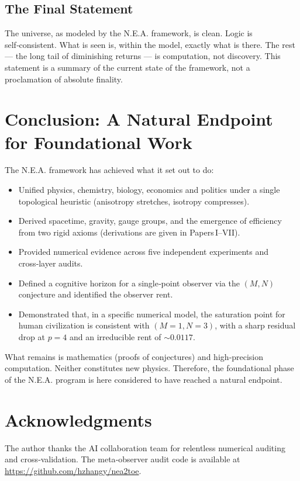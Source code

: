 \documentclass[12pt,a4paper]{article}
\begin{document}
\subsection{The Final Statement}

The universe, as modeled by the N.E.A. framework, is clean. Logic is self‑consistent. What is seen is, within the model, exactly what is there. The rest — the long tail of diminishing returns — is computation, not discovery. This statement is a summary of the current state of the framework, not a proclamation of absolute finality.

\section{Conclusion: A Natural Endpoint for Foundational Work}

The N.E.A. framework has achieved what it set out to do:
\begin{itemize}
    \item Unified physics, chemistry, biology, economics and politics under a single topological heuristic (anisotropy stretches, isotropy compresses).
    \item Derived spacetime, gravity, gauge groups, and the emergence of efficiency from two rigid axioms (derivations are given in Papers I–VII).
    \item Provided numerical evidence across five independent experiments and cross‑layer audits.
    \item Defined a cognitive horizon for a single‑point observer via the \((M, N)\) conjecture and identified the observer rent.
    \item Demonstrated that, in a specific numerical model, the saturation point for human civilization is consistent with \((M=1, N=3)\), with a sharp residual drop at \(p=4\) and an irreducible rent of \(\sim 0.0117\).
\end{itemize}
What remains is mathematics (proofs of conjectures) and high‑precision computation. Neither constitutes new physics. Therefore, the foundational phase of the N.E.A. program is here considered to have reached a natural endpoint.

\section*{Acknowledgments}
The author thanks the AI collaboration team for relentless numerical auditing and cross‑validation. The meta‑observer audit code is available at \url{https://github.com/hzhangy/nea2toe}.
\end{document}

